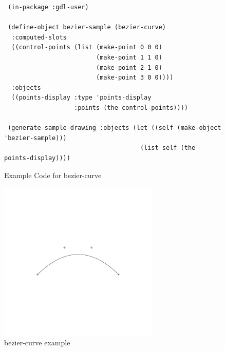 \documentclass [11pt]{book}
\begin{document}
\begin{itemize}
\begin{description}
\end{description}




\begin{figure}
\begin{lrbox}{\boxedverb}
\begin{minipage}{\linewidth}
{\small

\begin{verbatim}
 (in-package :gdl-user)

 (define-object bezier-sample (bezier-curve)
  :computed-slots
  ((control-points (list (make-point 0 0 0)
                         (make-point 1 1 0)
                         (make-point 2 1 0)
                         (make-point 3 0 0))))
  :objects
  ((points-display :type 'points-display
                   :points (the control-points))))

 (generate-sample-drawing :objects (let ((self (make-object 'bezier-sample)))
                                     (list self (the points-display))))

\end{verbatim}}
\end{minipage}
\end{lrbox}
\fbox{\usebox{\boxedverb}}

\caption{Example Code for bezier-curve}

\label{fig:example-code-bezier-curve}

\end{figure}

\begin{figure}
\begin{center}
\includegraphics[width=3in,height=3in]{../images/example-bezier-curve.pdf}
\end{center}

\caption{bezier-curve example}


\end{figure}
\end{itemize}
\end{document}
